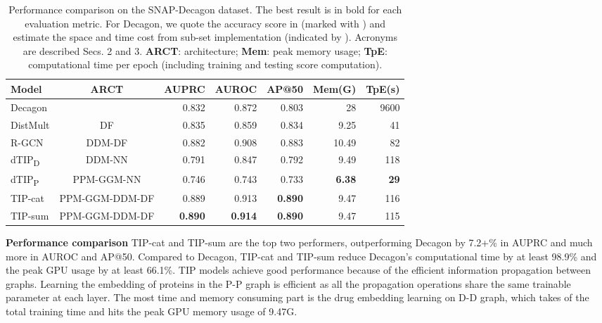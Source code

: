 \documentclass{article}
\begin{document}
\begin{table}[t]
		\caption{Performance comparison on the SNAP-Decagon dataset. The best result is in bold for each evaluation metric. For Decagon, we quote the accuracy score in \cite{decagon} (marked with ) and estimate the space and time cost from sub-set implementation (indicated by ). Acronyms are described Secs. 2 and 3. \textbf{ARCT}: architecture; \textbf{Mem}: peak memory usage; \textbf{TpE}: computational time per epoch (including training and testing score computation).}
		\vspace{1mm}
		\begin{tabular}{lcrrrrr}
			\toprule
			\textbf{Model}& \textbf{ARCT} & \textbf{AUPRC} & \textbf{AUROC} & \textbf{AP@50} & \textbf{Mem(G)} & \textbf{TpE(s)} \\
			\midrule
			Decagon & & 0.832 & 0.872& 0.803 & 28 & 9600  \\
			DistMult & DF         & 0.835 & 0.859 & 0.834 & 9.25 & 41 \\
			R-GCN &DDM-DF  & 0.882 & 0.908 & 0.883 & 10.49  & 82  \\
			\midrule
			dTIP\textsubscript{D} & DDM-NN & 0.791 & 0.847 & 0.792 & 9.49  &  118 \\
			dTIP\textsubscript{P} & PPM-GGM-NN  & 0.746 & 0.743 & 0.733 & \textbf{ 6.38} & \textbf{29}  \\
			TIP-cat & PPM-GGM-DDM-DF  & 0.889 & 0.913 & \textbf{0.890} & 9.47  & 116  \\
			TIP-sum & PPM-GGM-DDM-DF & \textbf{0.890} &\textbf{0.914} &\textbf{ 0.890} & 9.47  & 115   \\
			\bottomrule
		\end{tabular}
		\vspace{-5mm}
		\label{tab:xor}
	\end{table}

\textbf{Performance comparison} 
TIP-cat and TIP-sum are the top two performers, outperforming Decagon by 7.2+\% in AUPRC and much more in AUROC and AP@50. Compared to Decagon, TIP-cat and TIP-sum reduce Decagon's computational time by at least 98.9\% and the peak GPU usage by at least 66.1\%. 
TIP models achieve good performance because of the efficient information propagation between graphs. Learning the embedding of proteins in the P-P graph is efficient as all the propagation operations share the same trainable parameter at each layer. 
The most time and memory consuming part is the drug embedding learning on D-D graph, which takes  of the total training time and hits the peak GPU memory usage of 9.47G. 
\end{document}
